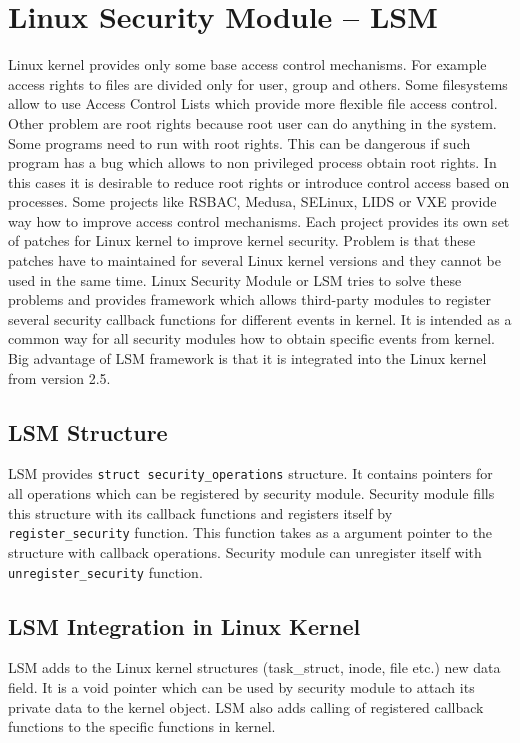 \chapter{Linux Security Module -- LSM}
\label{lab:lsm}
Linux kernel provides only some base access control mechanisms. For example access
rights to files are divided only for user, group and others. Some filesystems allow to
use Access Control Lists which provide more flexible file access control. Other
problem are root rights because root user can do anything in the system.
Some programs need to run with root rights. This can be dangerous if such program
has a bug which allows to non privileged process obtain root rights. In this cases it
is desirable to reduce root rights or introduce control access based on processes.
Some projects like RSBAC, Medusa, SELinux, LIDS or VXE provide way how to improve
access control mechanisms. Each project provides its own set of patches for Linux
kernel to improve kernel security. Problem is that these patches have to maintained for
several Linux kernel versions and they cannot be used in the same time. Linux
Security Module or LSM tries to solve these problems and provides framework which
allows third-party modules to register several security callback functions for
different events in kernel. It is intended as a common way for all security modules
how to obtain specific events from kernel. Big advantage of LSM framework is that it
is integrated into the Linux kernel from version 2.5.

\section{LSM Structure}
LSM provides \texttt{struct security\_operations} structure. It contains pointers
for all operations which can be registered by security module. Security module fills
this structure with its callback functions and registers itself by
\texttt{register\_security} function. This function takes as a argument pointer to the
structure with callback operations. Security module can unregister itself with
\texttt{unregister\_security} function. 

\section{LSM Integration in Linux Kernel}
LSM adds to the Linux kernel structures (task\_struct, inode, file etc.) new data
field. It is a void pointer which can be used by security module to attach its private
data to the kernel object. LSM also adds calling of registered callback functions to
the specific functions in kernel.

